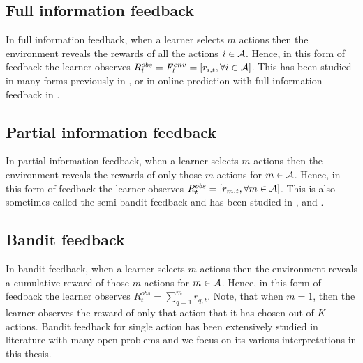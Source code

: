 \subsection{Full information feedback}
In full information feedback, when a learner selects $m$ actions then the environment reveals the rewards of all the actions $i\in \mathcal{A}$. Hence, in this form of feedback  the learner observes $R^{obs}_{t} = F^{env}_{t}=[r_{i,t},\forall i\in\mathcal{A}]$. This has been studied in many forms previously in \citet{takimoto2003path}, \citet{kalai2005efficient} or in online prediction with full information feedback in \citet{cesa2006prediction}.


\subsection{Partial information feedback}
In partial information feedback, when a learner selects $m$ actions then the environment reveals the rewards of only those $m$ actions for $m\in \mathcal{A}$. Hence, in this form of feedback  the learner observes $R^{obs}_{t} = [ r_{m,t},\forall m\in\mathcal{A} ]$. This is also sometimes called the semi-bandit feedback and has been studied in \citet{awerbuch2004adaptive},   \citet{mcmahan2004online} and \citet{gyorgy2007line}.


\subsection{Bandit feedback}
In bandit feedback, when a learner selects $m$ actions then the environment reveals a cumulative reward of those $m$ actions for $m\in \mathcal{A}$. Hence, in this form of feedback  the learner observes $R^{obs}_{t} = \sum_{q=1}^{m} r_{q,t}$. Note, that when $m=1$, then the learner observes the reward of only that action that it has chosen out of $K$ actions. Bandit feedback for single action has been extensively studied in literature with many open problems and we focus on its various interpretations in this thesis.
